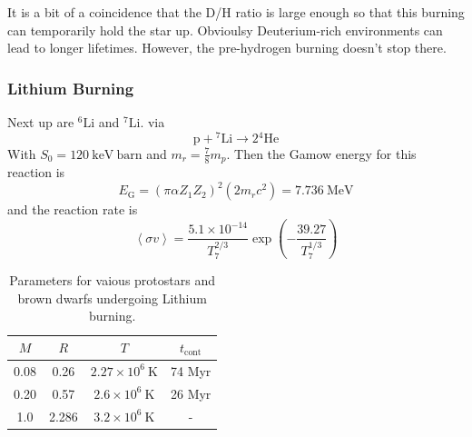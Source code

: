 \documentclass[10pt]{article}
\numberwithin{equation}{section}
\newcommand{\n}{\noindent}
\newcommand{\avg}[1]{\left\langle#1\right\rangle}
\begin{document}
  \n It is a bit of a coincidence that the D/H ratio is large enough so
  that this burning can temporarily hold the star up. Obvioulsy
  Deuterium-rich environments can lead to longer lifetimes. However,
  the pre-hydrogen burning doesn't stop there.
	\subsubsection{Lithium Burning} %
	\label{ssub:lithium_burning}
		Next up are
  ${}^6\mathrm{Li}$ and ${}^7\mathrm{Li}$. via
  \begin{equation}
    \label{eq:398}
    \mathrm{p+{}^7Li\to 2{}^4He}
  \end{equation}
  With $S_0=120\ \mathrm{keV\ barn}$ and $m_r=\frac{7}{8}m_p$. Then
  the Gamow energy for this reaction is
  \begin{equation}
    \label{eq:399}
    E_{\mathrm{G}}=(\pi\alpha Z_1Z_2)^2(2m_rc^2)=7.736\ \mathrm{MeV}
  \end{equation}
  and the reaction rate is
  \begin{equation}
    \label{eq:400}
    \avg{\sigma v}=\frac{5.1\times
      10^{-14}}{T_7^{2/3}}\exp\left(-\frac{39.27}{T_7^{1/3}}\right)
  \end{equation}
  \begin{table}[htb]
    \centering
    \begin{tabular}{cccc}
      $M$ & $R$ & $T$ & $t_{\mathrm{cont}}$\\
      \hline\hline
      0.08 & 0.26 & $2.27\times 10^{6}\ \mathrm{K}$ & 74 Myr\\
      0.20 & 0.57 & $2.6\times 10^6\ \mathrm{K}$ & 26 Myr\\
      1.0 & 2.286 & $3.2\times 10^6\ \mathrm{K}$ & -
    \end{tabular}
    \caption{Parameters for vaious protostars and brown dwarfs undergoing Lithium burning.}
    \label{tab:lithium}
  \end{table}
	
\end{document}
